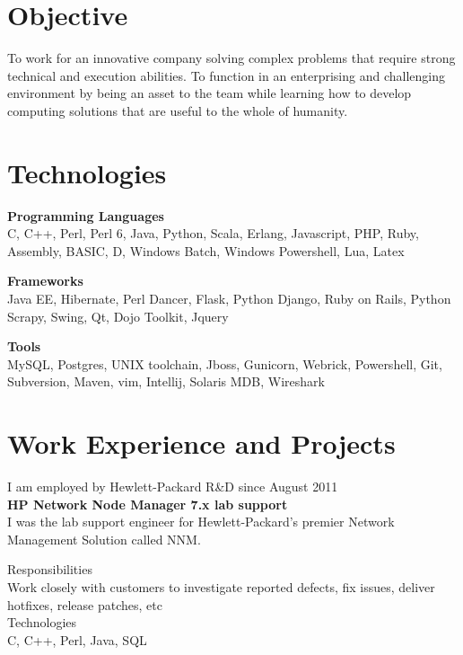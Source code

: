 \documentclass[line,margin]{res}
\begin{document}


\address{joji\_antony@gmx.com}
\address{+91 96323 41954}

\begin{resume}
\section{Objective}
To work for an innovative company solving complex problems that require strong technical and execution abilities. To function in an enterprising and challenging environment by being an asset to the team while learning how to develop computing solutions that are useful to the whole of humanity.\\

\section{Technologies}

{\bf Programming Languages}\\
C, C++, Perl, Perl 6, Java, Python, Scala, Erlang, Javascript, PHP, Ruby, Assembly, BASIC, D, Windows Batch, Windows Powershell, Lua, Latex

{\bf Frameworks}\\
Java EE, Hibernate, Perl Dancer, Flask, Python Django, Ruby on Rails, Python Scrapy, Swing, Qt, Dojo Toolkit, Jquery 

{\bf Tools}\\
MySQL, Postgres, UNIX toolchain, Jboss, Gunicorn, Webrick, Powershell, Git, Subversion, Maven, vim, Intellij, Solaris MDB, Wireshark

\section{Work Experience and Projects}

I am employed by Hewlett-Packard R\&D since August 2011\\

{\bf HP Network Node Manager 7.x lab support}\\
I was the lab support engineer for Hewlett-Packard's premier Network Management Solution called NNM.

Responsibilities\\
Work closely with customers to investigate reported defects, fix issues, deliver hotfixes, release patches, etc\\

Technologies\\
C, C++, Perl, Java, SQL\\


\end{resume}
\end{document}
